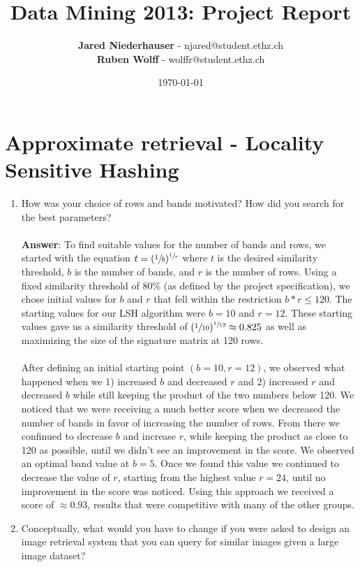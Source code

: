 \documentclass[11pt]{article}
\title{Data Mining 2013: Project Report}
\author{\textbf{Jared Niederhauser} - njared@student.ethz.ch\\
\textbf{Ruben Wolff} - wolffr@student.ethz.ch}
\date{\today}
\begin{document}
\maketitle

\section{Approximate retrieval - Locality Sensitive Hashing}
\begin{enumerate}
\item How was your choice of rows and bands motivated? How did you search for the
best parameters? \\ \\
\textbf{Answer}: To find suitable values for the number of bands and rows, we
started with the equation $t=(\sfrac{1}{b})^{\sfrac{1}{r}}$ where $t$ is the
desired similarity threshold, $b$ is the number of bands, and $r$ is the
number of rows.  Using a fixed similarity threshold of 80\% (as defined by the project specification), we chose initial values for
$b$ and $r$ that fell within the restriction $b*r\le 120$.  The
starting values for our LSH algorithm were $b=10$ and $r=12$.  These starting
values gave us a similarity threshold of
$(\sfrac{1}{10})^{\sfrac{1}{12}}\approx0.825$ as well as maximizing the size of
the signature matrix at 120 rows. \\ \\
After defining an initial starting point $(b=10, r=12)$, we observed what
happened when we 1) increased $b$ and decreased $r$ and 2) increased
$r$ and decreased $b$ while still keeping the product of the two
numbers below 120.  We noticed that we were receiving a much better score when
we decreased the number of bands in favor of increasing the number of rows. 
From there we confinued to decrease $b$ and increase $r$, while
keeping the product as close to 120 as possible, until we didn't see an
improvement in the score.  We observed an optimal band value at $b=5$.  Once we
found this value we continued to decrease the value of $r$, starting from the
highest value $r=24$, until no improvement in the score was noticed.  Using this
approach we received a score of $\approx 0.93$, results that were competitive
with many of the other groups.

\item Conceptually, what would you have to change if you were asked to design an image
  retrieval system that you can query for similar images given a large image
  dataset? \\


\end{enumerate}
\end{document}
